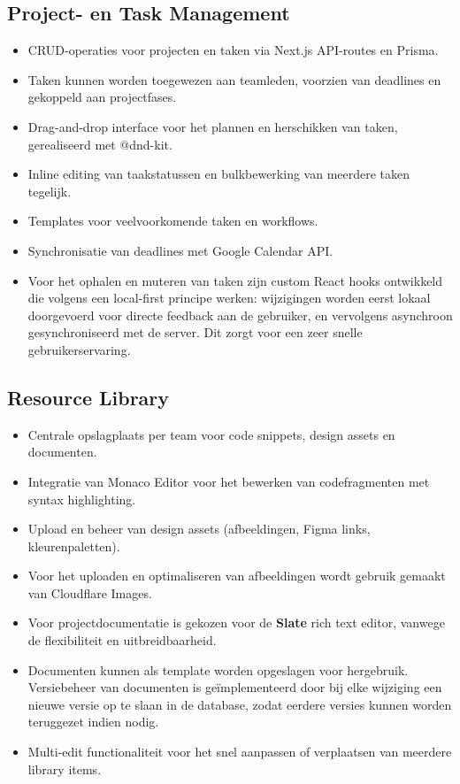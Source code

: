 \subsection{Project- en Task Management}
\begin{itemize}
    \item CRUD-operaties voor projecten en taken via Next.js API-routes en Prisma.
    \item Taken kunnen worden toegewezen aan teamleden, voorzien van deadlines en gekoppeld aan projectfases.
    \item Drag-and-drop interface voor het plannen en herschikken van taken, gerealiseerd met @dnd-kit.
    \item Inline editing van taakstatussen en bulkbewerking van meerdere taken tegelijk.
    \item Templates voor veelvoorkomende taken en workflows.
    \item Synchronisatie van deadlines met Google Calendar API.
    \item Voor het ophalen en muteren van taken zijn custom React hooks ontwikkeld die volgens een local-first principe werken: wijzigingen worden eerst lokaal doorgevoerd voor directe feedback aan de gebruiker, en vervolgens asynchroon gesynchroniseerd met de server. Dit zorgt voor een zeer snelle gebruikerservaring.
\end{itemize}

\subsection{Resource Library}
\begin{itemize}
    \item Centrale opslagplaats per team voor code snippets, design assets en documenten.
    \item Integratie van Monaco Editor voor het bewerken van codefragmenten met syntax highlighting.
    \item Upload en beheer van design assets (afbeeldingen, Figma links, kleurenpaletten).
    \item Voor het uploaden en optimaliseren van afbeeldingen wordt gebruik gemaakt van Cloudflare Images.
    \item Voor projectdocumentatie is gekozen voor de \textbf{Slate} rich text editor, vanwege de flexibiliteit en uitbreidbaarheid.
    \item Documenten kunnen als template worden opgeslagen voor hergebruik. Versiebeheer van documenten is geïmplementeerd door bij elke wijziging een nieuwe versie op te slaan in de database, zodat eerdere versies kunnen worden teruggezet indien nodig.
    \item Multi-edit functionaliteit voor het snel aanpassen of verplaatsen van meerdere library items.
\end{itemize}

